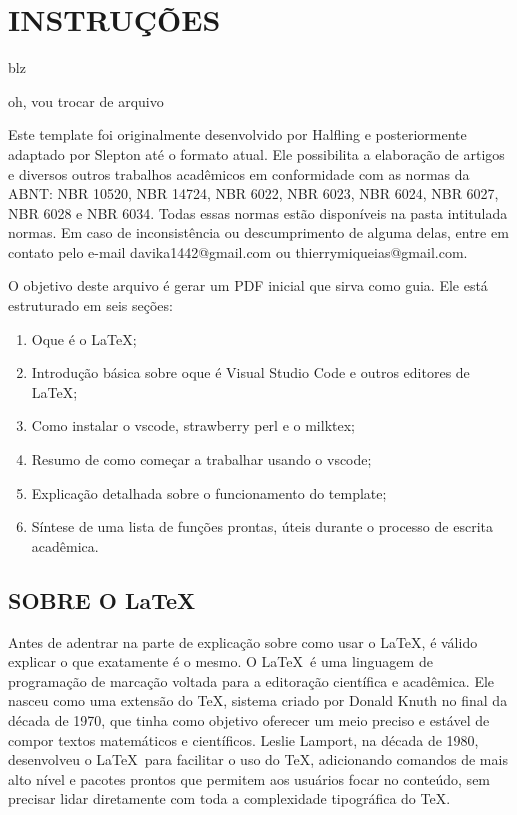 \section{INSTRUÇÕES}

blz


oh, vou trocar de arquivo



Este template foi originalmente desenvolvido por Halfling e posteriormente adaptado por Slepton até o formato atual. Ele possibilita a elaboração de artigos e diversos outros trabalhos acadêmicos em conformidade com as normas da ABNT: NBR 10520, NBR 14724, NBR 6022, NBR 6023, NBR 6024, NBR 6027, NBR 6028 e NBR 6034. Todas essas normas estão disponíveis na pasta intitulada normas. Em caso de inconsistência ou descumprimento de alguma delas, entre em contato pelo e-mail davika1442@gmail.com ou thierrymiqueias@gmail.com.

O objetivo deste arquivo é gerar um PDF inicial que sirva como guia. Ele está estruturado em seis seções:

\begin{enumerate}

\item Oque é o \LaTeX;

\item Introdução básica sobre oque é Visual Studio Code e outros editores de \LaTeX;

\item Como instalar o vscode, strawberry perl e o milktex;

\item Resumo de como começar a trabalhar usando o vscode;
  
\item Explicação detalhada sobre o funcionamento do template;

\item Síntese de uma lista de funções prontas, úteis durante o processo de escrita acadêmica.

\end{enumerate}

\subsection{SOBRE O \LaTeX}

Antes de adentrar na parte de explicação sobre como usar o \LaTeX, é válido explicar o que exatamente é o mesmo. O \LaTeX \ é uma linguagem de programação de marcação voltada para a editoração científica e acadêmica. Ele nasceu como uma extensão do TeX, sistema criado por Donald Knuth no final da década de 1970, que tinha como objetivo oferecer um meio preciso e estável de compor textos matemáticos e científicos. Leslie Lamport, na década de 1980, desenvolveu o \LaTeX \ para facilitar o uso do TeX, adicionando comandos de mais alto nível e pacotes prontos que permitem aos usuários focar no conteúdo, sem precisar lidar diretamente com toda a complexidade tipográfica do TeX.

